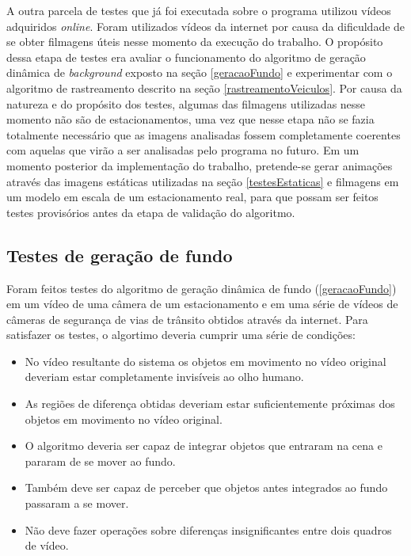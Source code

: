 A outra parcela de testes que já foi executada sobre o programa utilizou vídeos adquiridos \textit{online}. Foram utilizados vídeos da internet por causa da dificuldade de se obter filmagens úteis nesse momento da execução do trabalho. O propósito dessa etapa de testes era avaliar o funcionamento do algoritmo de geração dinâmica de \textit{background} exposto na seção \ref{geracaoFundo} e experimentar com o algoritmo de rastreamento descrito na seção \ref{rastreamentoVeiculos}. Por causa da natureza e do propósito dos testes, algumas das filmagens utilizadas nesse momento não são de estacionamentos, uma vez que nesse etapa não se fazia totalmente necessário que as imagens analisadas fossem completamente coerentes com aquelas que virão a ser analisadas pelo programa no futuro. Em um momento posterior da implementação do trabalho, pretende-se gerar animações através das imagens estáticas utilizadas na seção \ref{testesEstaticas} e filmagens em um modelo em escala de um estacionamento real, para que possam ser feitos testes provisórios antes da etapa de validação do algoritmo.

\subsection{Testes de geração de fundo} \label{testesFundo}

Foram feitos testes do algoritmo de geração dinâmica de fundo (\ref{geracaoFundo}) em um vídeo de uma câmera de um estacionamento e em uma série de vídeos de câmeras de segurança de vias de trânsito obtidos através da internet. Para satisfazer os testes, o algortimo deveria cumprir uma série de condições:
    \begin{itemize}
      \item No vídeo resultante do sistema os objetos em movimento no vídeo original deveriam estar completamente invisíveis ao olho humano.
      \item As regiões de diferença obtidas deveriam estar suficientemente próximas dos objetos em movimento no vídeo original.
      \item O algoritmo deveria ser capaz de integrar objetos que entraram na cena e pararam de se mover ao fundo.
      \item Também deve ser capaz de perceber que objetos antes integrados ao fundo passaram a se mover.
      \item Não deve fazer operações sobre diferenças insignificantes entre dois quadros de vídeo.
    \end{itemize}

